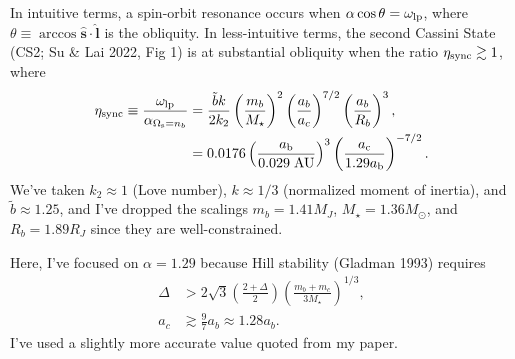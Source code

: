 \documentclass[12pt]{article}
\newcommand*{\bm}[1]{\boldsymbol{\mathbf{#1}}}
\newcommand*{\uv}[1]{\hat{\bm{#1}}}
\newcommand*{\p}[1]{\left(#1\right)}
\begin{document}
In intuitive terms, a spin-orbit resonance occurs when $\alpha \cos \theta =
\omega_{\rm lp}$, where $\theta \equiv \arccos \uv{s} \cdot \uv{l}$ is the
obliquity. In less-intuitive terms, the second Cassini State (CS2; Su \& Lai
2022, Fig 1) is at substantial obliquity when the ratio $\eta_{\rm sync} \gtrsim
1$, where
\begin{align}
    \eta_{\rm sync} \equiv \frac{\omega_{\rm lp}}{\alpha_{\Omega_{\rm s} = n_b}}
        &=
            \frac{\tilde{b}k}{2k_2}
                \p{\frac{m_b}{M_\star}}^2
                \p{\frac{a_b}{a_c}}^{7/2}
                \p{\frac{a_b}{R_b}}^3,\\
        &= 0.0176
            \p{\frac{a_{\rm b}}{0.029\;\mathrm{AU}}}^{3}
            \p{\frac{a_{\rm c}}{1.29 a_{\rm b}}}^{-7/2}.\label{eq:etasync}
\end{align}
We've taken $k_2 \approx 1$ (Love number), $k \approx 1/3$ (normalized moment of
inertia), and $\tilde{b} \approx 1.25$, and I've dropped the scalings $m_b =
1.41M_J$, $M_\star = 1.36M_\odot$, and $R_b = 1.89R_J$ since they are
well-constrained.

Here, I've focused on $\alpha = 1.29$ because Hill stability (Gladman 1993)
requires
\begin{align}
    \Delta &> 2\sqrt{3} \p{\frac{2 + \Delta}{2}}\p{\frac{m_b +
            m_c}{3M_\star}}^{1/3},\\
    a_c &\gtrsim \frac{9}{7}a_b \approx 1.28a_b.
\end{align}
I've used a slightly more accurate value quoted from my paper.

\end{document}
